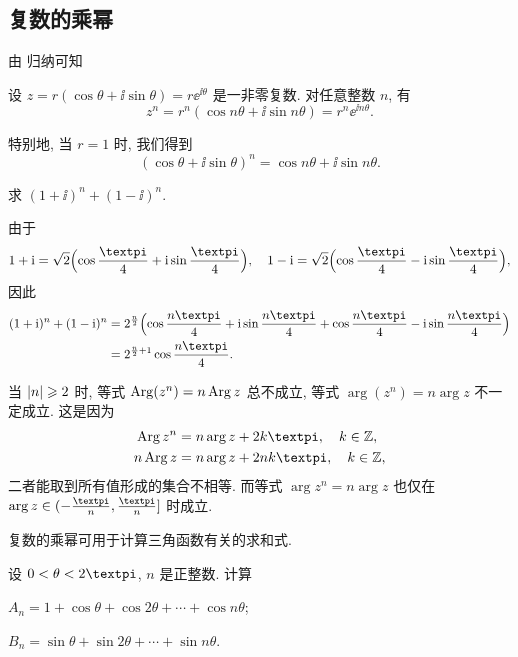 \subsection{复数的乘幂}

由 归纳可知
\begin{theorem}
  设 $z=r(\cos\theta+\ii\sin\theta)=r\ee^{\ii\theta}$ 是一非零复数.
  对任意整数 $n$, 有
  \[
    z^n=r^n(\cos{n\theta}+\ii\sin{n\theta})
    =r^n\ee^{\ii n\theta}.
  \]
\end{theorem}
特别地, 当 $r=1$ 时, 我们得到
\[
  (\cos\theta+\ii\sin\theta)^n=\cos{n\theta}+\ii\sin{n\theta}.
\]

\begin{example}
  求 $(1+\ii)^n+(1-\ii)^n$.
\end{example}

\begin{solution}
  由于
  \[
    1+\ii=\sqrt2\Bigl(\cos\frac\cpi4+\ii\sin\frac\cpi4\Bigr),\quad
    1-\ii=\sqrt2\Bigl(\cos\frac\cpi4-\ii\sin\frac\cpi4\Bigr),
  \]
  因此
  \begin{align*}
     (1+\ii)^n+(1-\ii)^n&
    =2^{\frac n2}\Bigl(\cos\frac{n\cpi}4+\ii\sin\frac{n\cpi}4 
      +\cos\frac{n\cpi}4-\ii\sin\frac{n\cpi}4\Bigr)\\&
    =2^{\frac n2+1}\cos\frac{n\cpi}4.
  \end{align*}
\end{solution}

当 $\lvert n\rvert\geqslant 2$ 时, 等式 $\operatorname{Arg}(z^n)=n\operatorname{Arg} z$ \alert{总不成立}, 等式 $\arg(z^n)=n\arg z$ \alert{不一定成立.} 
这是因为
\begin{align*}
  \Arg z^n&=n\arg z+2k\cpi,\quad k\in\BZ,\\
  n\Arg z&=n\arg z+2nk\cpi,\quad k\in\BZ,
\end{align*}
二者能取到所有值形成的集合不相等.
而等式 $\arg z^n=n\arg z$ 也仅在 $\arg z\in(-\frac\cpi n,\frac\cpi n]$ 时成立.


复数的乘幂可用于计算三角函数有关的求和式.

\begin{example}
  设 $0<\theta<2\cpi$, $n$ 是正整数. 计算
  \begin{subexample}
    \item $A_n=1+\cos\theta+\cos{2\theta}+\cdots+\cos{n\theta}$;
    \item $B_n=\sin\theta+\sin{2\theta}+\cdots+\sin{n\theta}$.
  \end{subexample}
\end{example}

